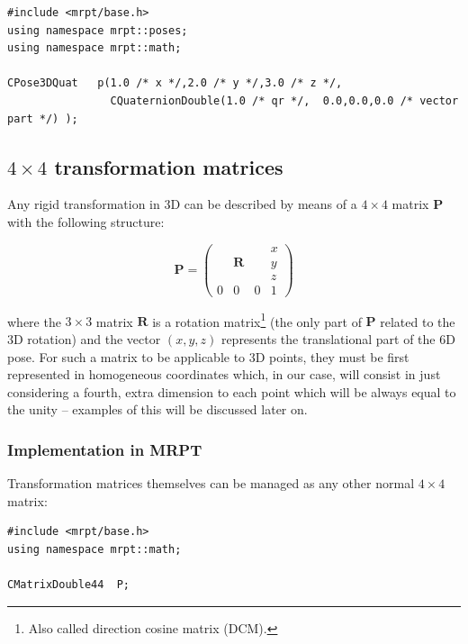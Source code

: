 \documentclass[a4paper,10pt]{report}
\begin{document}
\begin{lstlisting}
#include <mrpt/base.h> 
using namespace mrpt::poses; 
using namespace mrpt::math; 

CPose3DQuat   p(1.0 /* x */,2.0 /* y */,3.0 /* z */, 
                CQuaternionDouble(1.0 /* qr */,  0.0,0.0,0.0 /* vector part */) );
\end{lstlisting}


\newpage


\subsection{$4 \times 4$ transformation matrices}

Any rigid transformation in 3D can be described by means of a $4 \times 4$ 
matrix $\mathbf{P}$ with the following structure:

\begin{equation}
\mathbf{P}=\left(
  \begin{array}{ccc|c}
   & & & x \\
   & \mathbf{R} & & y \\
   & & & z \\ \hline
   0 & 0 & 0& 1
  \end{array}
\right)
\end{equation}

\noindent where the $3 \times 3$ matrix $\mathbf{R}$ is 
a rotation matrix\footnote{Also called direction cosine matrix (DCM).} 
(the only part of $\mathbf{P}$ related to 
the 3D rotation) and the vector $(x,y,z)$ represents the translational part of the 6D pose. 
For such a matrix to be applicable to 3D points, they must be first represented in 
homogeneous coordinates \cite{bloomenthal1994homogeneous} which, in our case, will consist in just considering a fourth,
extra dimension to each point which will be always equal to the unity -- examples of this will be discussed later on. 


\subsubsection{Implementation in MRPT}

Transformation matrices themselves can be managed as any other normal $4\times 4$ matrix:

\begin{lstlisting}
#include <mrpt/base.h> 
using namespace mrpt::math; 

CMatrixDouble44  P;
\end{lstlisting}
\end{document}
